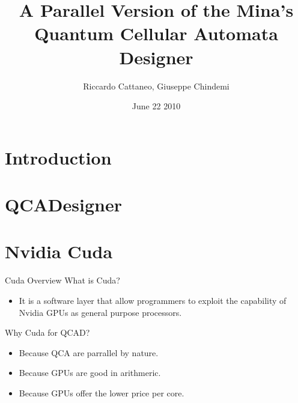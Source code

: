 \documentclass[10pt, red]{beamer}
\title[CudaQCAD]{A Parallel Version of the Mina's Quantum Cellular Automata Designer}
\author{Riccardo Cattaneo, Giuseppe Chindemi}
\institute{
  Politecnico di Milano\\
  HPPS
}
\date{June 22 2010}
\begin{document}
\begin{frame}
  \titlepage
\end{frame}


\section{Introduction}
	\begin{frame}{1}
	\end{frame}


\section{QCADesigner}
	\begin{frame}{2}
	\end{frame}


\section{Nvidia Cuda}

	\begin{frame}{Cuda Overview}
		What is Cuda?		
		\begin{itemize}
			\item It is a software layer that allow programmers to exploit the capability of Nvidia GPUs as general purpose processors.
		\end{itemize}
		Why Cuda for QCAD?
		\begin{itemize}
			\item Because QCA are parrallel by nature.
			\item Because GPUs are good in arithmeric.
			\item Because GPUs offer the lower price per core.
		\end{itemize}
	\end{frame}
\end{document}
